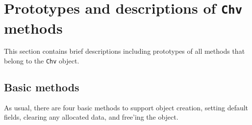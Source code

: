 \par
\section{Prototypes and descriptions of {\tt Chv} methods}
\label{section:Chv:proto}
\par
This section contains brief descriptions including prototypes
of all methods that belong to the {\tt Chv} object.
\par
\subsection{Basic methods}
\label{subsection:Chv:proto:basics}
\par
As usual, there are four basic methods to support object creation,
setting default fields, clearing any allocated data, and free'ing
the object.
\par
